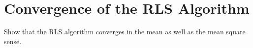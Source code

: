 \documentclass[journal,12pt,twocolumn]{IEEEtran}
\begin{document}
\section{Convergence of the RLS Algorithm}
\begin{problem}
Show that the RLS algorithm converges in the mean as well as the mean square sense.
\end{problem}
%
%
\end{document}
